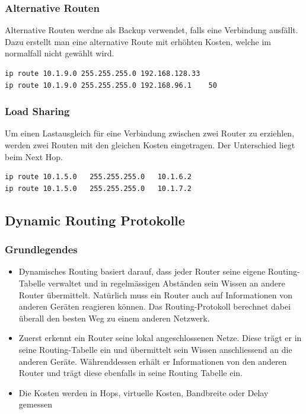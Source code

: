 \subsubsection{Alternative Routen}
Alternative Routen werdne als Backup verwendet, falls eine Verbindung ausfällt. Dazu erstellt man eine alternative Route mit erhöhten Kosten, welche im normalfall nicht gewählt wird.
\begin{lstlisting}
ip route 10.1.9.0 255.255.255.0 192.168.128.33
ip route 10.1.9.0 255.255.255.0 192.168.96.1  	50	
\end{lstlisting}

\subsubsection{Load Sharing}
Um einen Lastausgleich für eine Verbindung zwischen zwei Router zu erziehlen, werden zwei Routen mit den gleichen Kosten eingetragen. Der Unterschied liegt beim Next Hop.
\begin{lstlisting}
ip route 10.1.5.0	255.255.255.0	10.1.6.2	
ip route 10.1.5.0	255.255.255.0	10.1.7.2	
\end{lstlisting}	
	


\subsection{Dynamic Routing Protokolle}
\subsubsection{Grundlegendes}
\begin{itemize}
	\item Dynamisches Routing basiert darauf, dass jeder Router seine eigene Routing-Tabelle verwaltet und in regelmässigen Abständen sein Wissen an andere Router übermittelt. Natürlich muss ein Router auch auf Informationen von anderen Geräten reagieren können. Das Routing-Protokoll berechnet dabei überall den besten Weg zu einem anderen Netzwerk.
	\item Zuerst erkennt ein Router seine lokal angeschlossenen Netze. Diese trägt er in seine Routing-Tabelle ein und übermittelt sein Wissen anschliessend an die anderen Geräte. Währenddessen erhält er Informationen von den anderen Router und trägt diese ebenfalls in seine Routing Tabelle ein.
	\item Die Kosten werden in Hops, virtuelle Kosten, Bandbreite oder Delay gemessen
\end{itemize}

